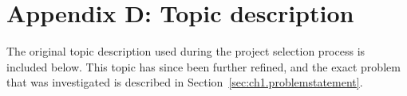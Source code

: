 

\chapter*{Appendix D: Topic description}
The original topic description used during the project selection process is included below. This topic has since been further refined, and the exact problem that was investigated is described in Section~\ref{sec:ch1.problemstatement}.

%

